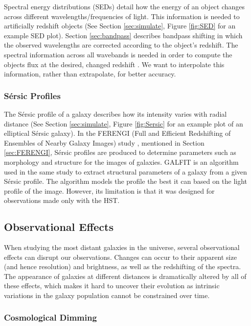 \documentclass[fleqn,usenatbib]{mnras}
\begin{document}
Spectral energy distributions (SEDs) detail how the energy of an object changes across different wavelengths/frequencies of light. This information is needed to artificially redshift objects (See Section \ref{sec:simulate}, Figure \ref{fig:SED} for an example SED plot). Section \ref{sec:bandpass} describes bandpass shifting in which the observed wavelengths are corrected according to the object’s redshift. The spectral information across all wavebands is needed in order to compute the objects flux at the desired, changed redshift \citep{Barden2008}. We want to interpolate this information, rather than extrapolate, for better accuracy.

\subsubsection{S\'ersic Profiles}
\label{sec:Sersic}

The S\'ersic profile of a galaxy describes how its intensity varies with radial distance (See Section \ref{sec:simulate}, Figure \ref{fig:Sersic} for an example plot of an elliptical S\'ersic galaxy). In the FERENGI (Full and Efficient Redshifting of Ensembles of Nearby Galaxy Images) study \citet{Barden2008}, mentioned in Section \ref{sec:FERENGI}, S\'ersic profiles are produced to determine parameters such as morphology and structure for the images of galaxies. GALFIT \citep{Peng2002} is an algorithm used in the same study to extract structural parameters of a galaxy from a given S\'ersic profile. The algorithm models the profile the best it can based on the light profile of the image. However, its limitation is that it was designed for observations made only with the HST.


\subsection{Observational Effects}
\label{sec:intro_obs_effects}

When studying the most distant galaxies in the universe, several observational effects can disrupt our observations. Changes can occur to their apparent size (and hence resolution) and brightness, as well as the redshifting of the spectra. The appearance of galaxies at different distances is dramatically altered by all of these effects, which makes it hard to uncover their evolution as intrinsic variations in the galaxy population cannot be constrained over time.

\subsubsection{Cosmological Dimming}
\label{sec:dimming}
\end{document}
